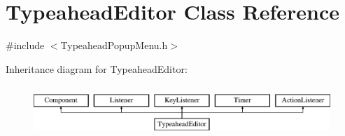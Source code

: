 \hypertarget{class_typeahead_editor}{}\section{Typeahead\+Editor Class Reference}
\label{class_typeahead_editor}


{\ttfamily \#include $<$Typeahead\+Popup\+Menu.\+h$>$}

Inheritance diagram for Typeahead\+Editor\+:\begin{figure}[H]
\begin{center}
\leavevmode
\includegraphics[height=1.931034cm]{class_typeahead_editor}
\end{center}
\end{figure}
